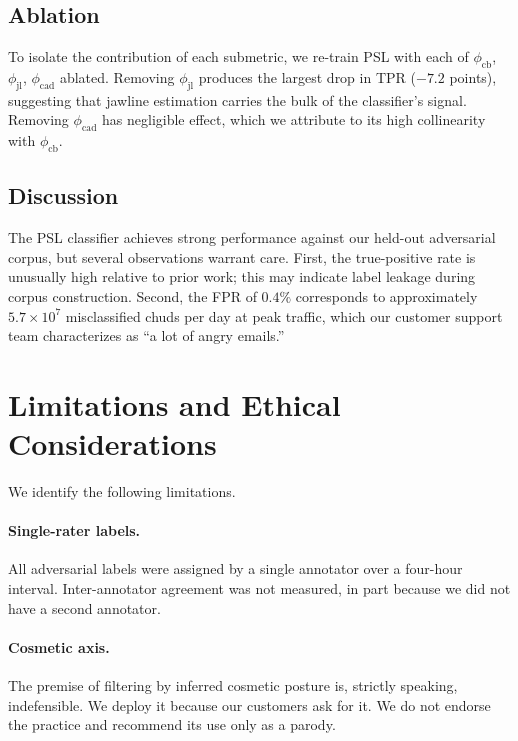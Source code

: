 \documentclass[10pt,twocolumn,letterpaper]{article}
\begin{document}
\subsection{Ablation}

To isolate the contribution of each submetric, we re-train PSL with each
of $\phi_{\text{cb}}$, $\phi_{\text{jl}}$, $\phi_{\text{cad}}$ ablated.
Removing $\phi_{\text{jl}}$ produces the largest drop in TPR ($-7.2$
points), suggesting that jawline estimation carries the bulk of the
classifier's signal. Removing $\phi_{\text{cad}}$ has negligible effect,
which we attribute to its high collinearity with $\phi_{\text{cb}}$.

\subsection{Discussion}

The PSL classifier achieves strong performance against our held-out
adversarial corpus, but several observations warrant care. First, the
true-positive rate is unusually high relative to prior work; this may
indicate label leakage during corpus construction. Second, the FPR of
$0.4\%$ corresponds to approximately $5.7 \times 10^7$ misclassified
chuds per day at peak traffic, which our customer support team
characterizes as ``a lot of angry emails.''

\section{Limitations and Ethical Considerations}
\label{sec:limits}

We identify the following limitations.

\paragraph{Single-rater labels.} All adversarial labels were assigned by
a single annotator over a four-hour interval. Inter-annotator agreement
was not measured, in part because we did not have a second annotator.

\paragraph{Cosmetic axis.} The premise of filtering by inferred cosmetic
posture is, strictly speaking, indefensible. We deploy it because our
customers ask for it. We do not endorse the practice and recommend its
use only as a parody.
\end{document}
